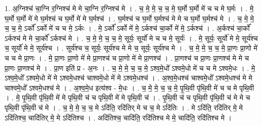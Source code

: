 \documentclass[17pt]{extarticle}
\begin{document}
1. अ॒ग्निश्च॑ चा॒ग्नि र॒ग्निश्च॑ मे मे चा॒ग्नि र॒ग्निश्च॑ मे । . च॒ मे॒ मे॒ च॒ च॒ मे॒ घ॒र्मो घ॒र्मो मे॑ च च मे घ॒र्मः । . मे॒ घ॒र्मो घ॒र्मो मे॑ मे घ॒र्मश्च॑ च घ॒र्मो मे॑ मे घ॒र्मश्च॑ । . घ॒र्मश्च॑ च घ॒र्मो घ॒र्मश्च॑ मे मे च घ॒र्मो घ॒र्मश्च॑ मे । . च॒ मे॒ मे॒ च॒ च॒ मे॒ ऽर्को᳚ ऽर्को मे॑ च च मे॒ ऽर्कः । . मे॒ ऽर्को᳚ ऽर्को मे॑ मे॒ ऽर्कश्च॑ चा॒र्को मे॑ मे॒ ऽर्कश्च॑ । . अ॒र्कश्च॑ चा॒र्को᳚ ऽर्कश्च॑ मे मे चा॒र्को᳚ ऽर्कश्च॑ मे । . च॒ मे॒ मे॒ च॒ च॒ मे॒ सूर्यः॒ सूर्यो॑ मे च च मे॒ सूर्यः॑ । . मे॒ सूर्यः॒ सूर्यो॑ मे मे॒ सूर्य॑श्च च॒ सूर्यो॑ मे मे॒ सूर्य॑श्च । . सूर्य॑श्च च॒ सूर्यः॒ सूर्य॑श्च मे मे च॒ सूर्यः॒ सूर्य॑श्च मे । . च॒ मे॒ मे॒ च॒ च॒ मे॒ प्रा॒णः प्रा॒णो मे॑ च च मे प्रा॒णः । . मे॒ प्रा॒णः प्रा॒णो मे॑ मे प्रा॒णश्च॑ च प्रा॒णो मे॑ मे प्रा॒णश्च॑ । . प्रा॒णश्च॑ च प्रा॒णः प्रा॒णश्च॑ मे मे च प्रा॒णः प्रा॒णश्च॑ मे । . प्रा॒ण इति॑ प्र - अ॒नः । . च॒ मे॒ मे॒ च॒ च॒ मे॒ ऽश्व॒मे॒धो᳚ ऽश्वमे॒धो मे॑ च च मे ऽश्वमे॒धः । . मे॒ ऽश्व॒मे॒धो᳚ ऽश्वमे॒धो मे॑ मे ऽश्वमे॒धश्च॑ चाश्वमे॒धो मे॑ मे ऽश्वमे॒धश्च॑ । . अ॒श्व॒मे॒धश्च॑ चाश्वमे॒धो᳚ ऽश्वमे॒धश्च॑ मे मे चाश्वमे॒धो᳚ ऽश्वमे॒धश्च॑ मे । . अ॒श्व॒मे॒ध इत्य॑श्व - मे॒धः । . च॒ मे॒ मे॒ च॒ च॒ मे॒ पृ॒थि॒वी पृ॑थि॒वी मे॑ च च मे पृथि॒वी । . मे॒ पृ॒थि॒वी पृ॑थि॒वी मे॑ मे पृथि॒वी च॑ च पृथि॒वी मे॑ मे पृथि॒वी च॑ । . पृ॒थि॒वी च॑ च पृथि॒वी पृ॑थि॒वी च॑ मे मे च पृथि॒वी पृ॑थि॒वी च॑ मे । . च॒ मे॒ मे॒ च॒ च॒ मे ऽदि॑ति॒ रदि॑तिर् मे च च॒ मे ऽदि॑तिः । . मे ऽदि॑ति॒ रदि॑तिर् मे॒ मे ऽदि॑तिश्च॒ चादि॑तिर् मे॒ मे ऽदि॑तिश्च । . अदि॑तिश्च॒ चादि॑ति॒ रदि॑तिश्च मे मे॒ चादि॑ति॒ रदि॑तिश्च मे । \newline
\end{document}
